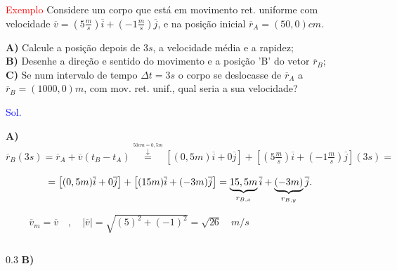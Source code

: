 \documentclass{beamer}
\begin{document}
	\begin{frame}{}
		\footnotesize
		\textcolor{red}{Exemplo} \quad Considere um corpo que está em movimento ret. uniforme com velocidade $\overline{v} = \left(5 \frac{m}{s}\right)\overline{i} + \left(-1 \frac{m}{s}\right)\overline{j}$, e na posição inicial $\overline{r}_A = (50, 0) cm$.
		
		\vspace{0.2cm}
		\textbf{A)} Calcule a posição depois de $3s$, a velocidade média e a rapidez; \\
		\textbf{B)} Desenhe a direção e sentido do movimento e a posição 'B' do vetor $\overline{r}_B$; \\
		\textbf{C)} Se num intervalo de tempo $\Delta t = 3s$ o corpo se deslocasse de $\overline{r}_A$ a $\overline{r}_B = (1000, 0)m$, com mov. ret. unif., qual seria a sua velocidade?
		
		\vspace{0.2cm}
		\textcolor{blue}{Sol.}
		
		\vspace{0.1cm}
		\textbf{A)} \quad $\displaystyle \overline{r}_B(3s) = \overline{r}_A + \overline{v}(t_B - t_A) \overset{\overset{50cm = 0,5m}{\downarrow}}{=} \left[(0,5m)\overline{i} + 0\overline{j}\right] + \left[\left(5\frac{m}{s}\right)\overline{i} + \left(-1\frac{m}{s}\right)\overline{j}\right](3s) =$
		
		\vspace{0.1cm}
		$\hspace{1.5cm} = \left[(0,5m)\overline{i} + 0\overline{j}\right] + \left[(15m)\overline{i} + (-3m)\overline{j}\right] = \underbrace{15,5m}_{r_{B,x}}\overline{i} + \underbrace{(-3m)}_{r_{B,y}}\overline{j}.$
		
		\vspace{0.2cm}
		$\hspace{1cm} \overline{v}_m = \overline{v} \quad , \quad |\overline{v}| = \sqrt{(5)^2 + (-1)^2} = \sqrt{26} \quad m/s$
		
		\vspace{0.1cm}
		\begin{columns}[T]
			\begin{column}{0.3\textwidth}
				\textbf{B)}
				\begin{center}
					\vspace{-0.6cm}
\end{center}
\end{column}
\end{columns}
\end{frame}
\end{document}
